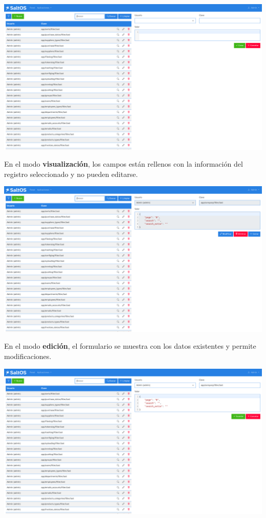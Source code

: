 \documentclass[a4paper]{article}
\begin{document}
\begin{center}\includegraphics[width=1\textwidth]{../ujest/snaps/test-screenshots-js-screenshots-common-configlog-create-es-es-1-snap.png}\end{center}

En el modo \textbf{visualización}, los campos están rellenos con la información del registro seleccionado y no pueden editarse.

\begin{center}\includegraphics[width=1\textwidth]{../ujest/snaps/test-screenshots-js-screenshots-common-configlog-view-10-es-es-1-snap.png}\end{center}

En el modo \textbf{edición}, el formulario se muestra con los datos existentes y permite modificaciones.

\begin{center}\includegraphics[width=1\textwidth]{../ujest/snaps/test-screenshots-js-screenshots-common-configlog-edit-10-es-es-1-snap.png}\end{center}
\end{document}
